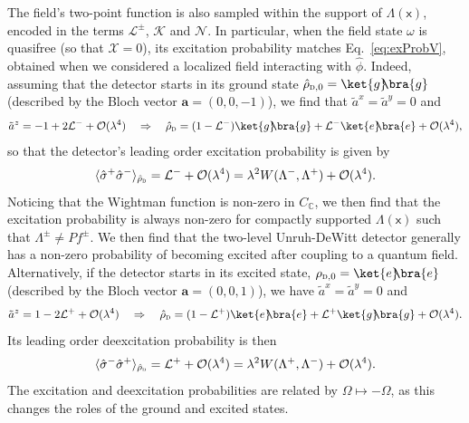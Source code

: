 \documentclass[letterpaper,12pt,titlepage,oneside,final]{book}
\newcommand{\mf}{\mathsf}%
\renewcommand{\r}{\hat{\rho}}
\newcommand{\s}{\hat{\sigma}}
\newcommand{\tc}[1]{\textsc{#1}}
\begin{document}
The field's two-point function is also sampled within the support of $\Lambda(\mf x)$, encoded in the terms $\mathcal{L}^\pm$, $\mathcal{K}$ and $\mathcal{N}$. In particular, when the field state $\omega$ is quasifree (so that $\mathcal{X} = 0$), its excitation probability matches Eq.~\eqref{eq:exProbV}, obtained when we considered a localized field interacting with $\hat{\phi}$. Indeed, assuming that the detector starts in its ground state $\r_{\tc{d},0} = \ket{g}\!\!\bra{g}$ (described by the Bloch vector $\bm a = (0,0,-1)$), we find that $\tilde{a}^x = \tilde{a}^y = 0$ and
\begin{equation}
    \tilde{a}^z = -1 + 2\mathcal{L}^- + \mathcal{O}(\lambda^4) \quad \Rightarrow \quad  \hat{\rho}_{\tc{d}} = (1 - \mathcal{L}^-)\ket{g}\!\!\bra{g} +  \mathcal{L}^-\ket{e}\!\!\bra{e} + \mathcal{O}(\lambda^4),
\end{equation}
so that the detector's leading order excitation probability is given by
\begin{equation}
    \langle \s^+\s^-\rangle_{\hat{\rho}_\tc{d}} = \mathcal{L}^-  + \mathcal{O}(\lambda^4)= \lambda^2 W(\Lambda^-,\Lambda^+) + \mathcal{O}(\lambda^4).
\end{equation}
Noticing that the Wightman function is non-zero in $C_\mathbb{C}$, we then find that the excitation probability is always non-zero for compactly supported $\Lambda(\mf x)$ such that $\Lambda^\pm\neq Pf^\pm$. We then find that the two-level Unruh-DeWitt detector generally has a non-zero probability of becoming excited after coupling to a quantum field. Alternatively, if the detector starts in its excited state,  $\rho_{\tc{d},0} = \ket{e}\!\!\bra{e}$ (described by the Bloch vector $\bm a = (0,0,1)$), we have $\tilde{a}^x = \tilde{a}^y = 0$ and
\begin{equation}
    \tilde{a}^z = 1 - 2  \mathcal{L}^+ + \mathcal{O}(\lambda^4) \quad \Rightarrow \quad  \hat{\rho}_{\tc{d}} =(1 - \mathcal{L}^+)\ket{e}\!\!\bra{e} +  \mathcal{L}^+\ket{g}\!\!\bra{g} + \mathcal{O}(\lambda^4).
\end{equation}
Its leading order deexcitation probability is then
\begin{equation}
    \langle \s^-\s^+\rangle_{\hat{\rho}_\tc{d}}  = \mathcal{L}^+ + \mathcal{O}(\lambda^4) = \lambda^2 W(\Lambda^+,\Lambda^-) + \mathcal{O}(\lambda^4).
\end{equation}
The excitation and deexcitation probabilities are related by $\Omega \mapsto -\Omega$, as this changes the roles of the ground and excited states.
\end{document}
